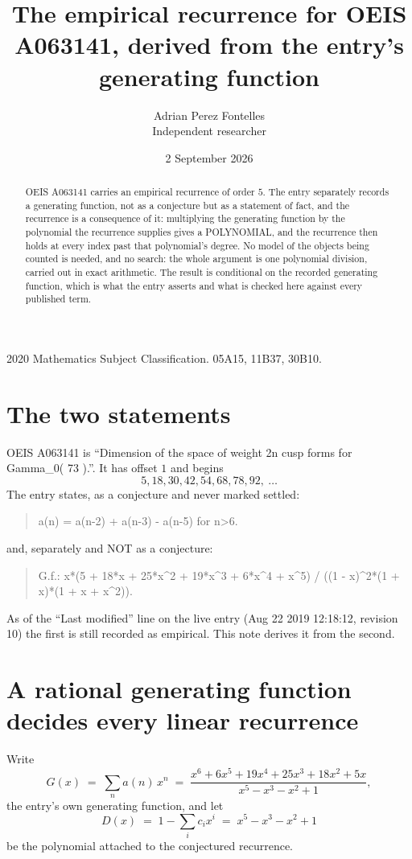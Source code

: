 \documentclass[11pt,a4paper]{article}
\title{The empirical recurrence for OEIS A063141, derived from the entry's generating function}
\author{Adrian Perez Fontelles\\ \small Independent researcher}
\date{2 September 2026}
\theoremstyle{plain}
\theoremstyle{definition}
\begin{document}
\maketitle

\begin{abstract}
OEIS A063141 carries an empirical recurrence of order $5$. The entry separately records a
generating function, not as a conjecture but as a statement of fact, and the recurrence is a
consequence of it: multiplying the generating function by the polynomial the recurrence
supplies gives a POLYNOMIAL, and the recurrence then holds at every index past that
polynomial's degree. No model of the objects being counted is needed, and no search: the
whole argument is one polynomial division, carried out in exact arithmetic. The result is
conditional on the recorded generating function, which is what the entry asserts and what is
checked here against every published term.
\end{abstract}

\noindent\small 2020 Mathematics Subject Classification. 05A15, 11B37, 30B10.\normalsize

\section{The two statements}

OEIS A063141 is ``Dimension of the space of weight 2n cusp forms for Gamma\_0( 73 ).''. It has offset $1$ and begins
\[
5, 18, 30, 42, 54, 68, 78, 92,\ \dots
\]
The entry states, as a conjecture and never marked settled:
\begin{quote}
a(n) = a(n-2) + a(n-3) - a(n-5) for n>6.
\end{quote}
and, separately and NOT as a conjecture:
\begin{quote}
G.f.: x*(5 + 18*x + 25*x\^{}2 + 19*x\^{}3 + 6*x\^{}4 + x\^{}5) / ((1 - x)\^{}2*(1 + x)*(1 + x + x\^{}2)).
\end{quote}
As of the ``Last modified'' line on the live entry (Aug 22 2019 12:18:12, revision 10) the first is still
recorded as empirical. This note derives it from the second.

\section{A rational generating function decides every linear recurrence}

Write
\[
G(x)\;=\;\sum_{n}a(n)\,x^{n}\;=\;\frac{x^{6} + 6 x^{5} + 19 x^{4} + 25 x^{3} + 18 x^{2} + 5 x}{x^{5} - x^{3} - x^{2} + 1},
\]
the entry's own generating function, and let
\[
D(x)\;=\;1-\sum_i c_i x^{i}\;=\;x^{5} - x^{3} - x^{2} + 1
\]
be the polynomial attached to the conjectured recurrence.
\end{document}
